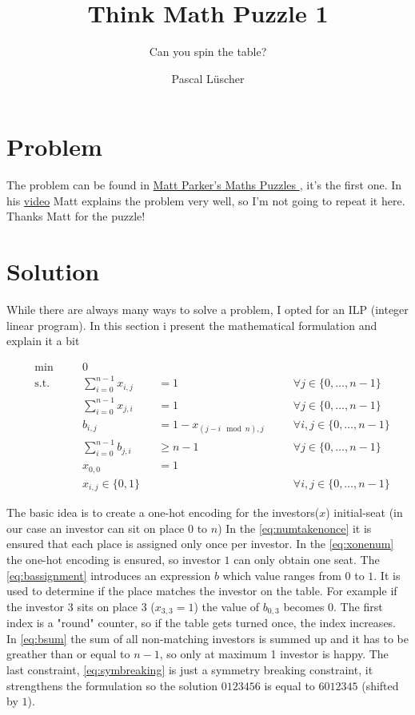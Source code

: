 \documentclass[parskip=half]{scrartcl}
\title{Think Math Puzzle 1}
\subtitle{Can you spin the table?}
\author{Pascal Lüscher}
\newcommand{\zeroton}{\{0,\ldots,n-1\}}
\begin{document}
	
	\maketitle
		
	\section{Problem}
	The problem can be found in \href{https://www.think-maths.co.uk/maths-puzzles}{ Matt Parker's Maths Puzzles
}, it's the first one. In his \href{https://www.youtube.com/watch?v=T29dydI97zY}{video} Matt explains the problem very well, so I'm not going to repeat it here. Thanks Matt for the puzzle!
		
	
	\section{Solution}
	While there are always many ways to solve a problem, I opted for an ILP (integer linear program). 
	In this section i present the mathematical formulation and explain it a bit

	\begin{align}
		&\min \quad &&0 \\
		& \text{s.t.} \quad 
		&& \sum_{i=0}^{n-1}x_{i,j}		&&= 1 			&&\quad \forall j \in \zeroton \label{eq:numtakenonce} \\		
		& && \sum_{i=0}^{n-1}x_{j,i}		&&= 1	 		&&\quad \forall j \in \zeroton \label{eq:xonenum} \\
		& && b_{i,j}  					&&= 1 - x_{(j - i \mod n),j}	&&\quad \forall i,j \in \zeroton \label{eq:bassignment} \\
		& && \sum_{i=0}^{n-1}b_{j,i}		&&\geq n-1 		&&\quad \forall j \in \zeroton \label{eq:bsum} \\
		& && x_{0,0}					&&= 1			&& \label{eq:symbreaking}\\
		& && x_{i,j} \in \{0,1\} 		&& 				&&\quad \forall i,j \in \zeroton \label{eq:binary}
	\end{align}
	
	The basic idea is to create a one-hot encoding for the investors($x$) initial-seat (in our case an investor can sit on place $0$ to $n$)
	In the \autoref{eq:numtakenonce} it is ensured that each place is assigned only once per investor. In the \autoref{eq:xonenum} the one-hot encoding is ensured, so investor $1$ can only obtain one seat. 
	The \autoref{eq:bassignment} introduces an expression $b$ which value ranges from $0$ to $1$. It is used to determine if the place matches the investor on the table. For example if the investor 3 sits on place 3 ($x_{3,3} = 1$) the value of $b_{0,3}$ becomes $0$. The first index is a "round" counter, so if the table gets turned once, the index increases. In \autoref{eq:bsum} the sum of all non-matching investors is summed up and it has to be greather than or equal to $n-1$, so only at maximum 1 investor is happy.
	The last constraint, \autoref{eq:symbreaking} is just a symmetry breaking constraint, it strengthens the formulation so the solution $0123456$ is equal to $6012345$ (shifted by $1$).
	
\end{document}
